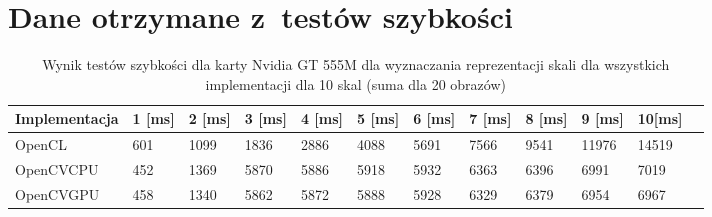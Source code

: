 \chapter{Dane otrzymane z~testów szybkości}
\label{cha:daneTestySzybjkosci}


\begin{table}[h]
\caption{Wynik testów szybkości dla karty Nvidia GT 555M dla wyznaczania reprezentacji skali dla wszystkich implementacji dla 10 skal (suma dla 20 obrazów) }
\label{tab:allGT}

\begin{tabular}{|l|l|l|l|l|l|l|l|l|l|l|l|}
\hline
Implementacja & 1 [ms] & 2 [ms] & 3 [ms] & 4  [ms]  & 5 [ms]   & 6 [ms]   & 7  [ms]  & 8 [ms]   & 9 [ms]    & 10[ms]    \\ \hline
OpenCL               & 601        & 1099              & 1836     & 2886 & 4088 & 5691 & 7566 & 9541 & 11976 & 14519 \\ \hline
OpenCVCPU            & 452        & 1369              & 5870     & 5886 & 5918 & 5932 & 6363 & 6396 & 6991  & 7019  \\ \hline
OpenCVGPU            & 458        & 1340              & 5862     & 5872 & 5888 & 5928 & 6329 & 6379 & 6954  & 6967  \\ \hline
\end{tabular}
\end{table}

